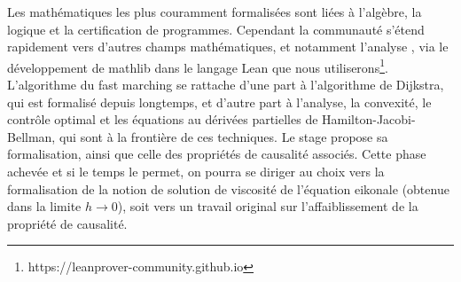 \documentclass[11pt]{article}
\begin{document}
Les mathématiques les plus couramment formalisées sont liées à l'algèbre, la logique et la certification de programmes. Cependant la communauté s'étend rapidement vers d'autres champs mathématiques, et notamment l'analyse \cite{van2023formalising}, via le développement de mathlib dans le langage Lean que nous utiliserons\footnote{https://leanprover-community.github.io}. L'algorithme du fast marching se rattache d'une part à l'algorithme de Dijkstra, qui est formalisé depuis longtemps, et d'autre part à l'analyse, la convexité, le contrôle optimal et les équations au dérivées partielles de Hamilton-Jacobi-Bellman, qui sont à la frontière de ces techniques. Le stage propose sa formalisation, ainsi que celle des propriétés de causalité associés. Cette phase achevée et si le temps le permet, on pourra se diriger au choix vers la formalisation de la notion de solution de viscosité de l'équation eikonale (obtenue dans la limite $h \to 0$), soit vers un travail original sur l'affaiblissement de la propriété de causalité. 




\end{document}
